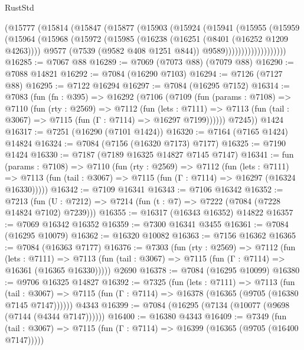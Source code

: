 \begin{lexlean}{RustStd}
\begin{coremodule}
                (@15777
                  (@15814
                    (@15847
                      (@15877
                        (@15903
                          (@15924
                            (@15941
                              (@15955
                                (@15959
                                  (@15964
                                    (@15968
                                      (@15972
                                        (@15985
                                          (@16238 (@16251 (@8401 (@16252 @1209 @4263))))
                                          @9577
                                          (@7539 (@9582 @408 @1251 @844))
                                          @9589)))))))))))))))))))
@16285 := @7067 @88
@16289 := @7069 (@7073 @88) (@7079 @88)
@16290 := @7088 @14821
@16292 := @7084 (@16290 @7103)
@16294 := @7126 (@7127 @88)
@16295 := @7122 @16294
@16297 := @7084 (@16295 @7152)
@16314 := @7083
    (fun (fn : @395) =>
    @16292
      (@7106
        (@7109
          (fun (params : @7108) =>
          @7110
            (fun (rty : @2569) =>
            @7112
              (fun (lets : @7111) =>
              @7113 (fun (tail : @3067) => @7115 (fun (Γ : @7114) => @16297 @7199))))))
        @7245))
    @1424
@16317 := @7251 (@16290 (@7101 @1424))
@16320 := @7164 (@7165 @1424) @14824
@16324 := @7084 (@7156 (@16320 @7173) @7177)
@16325 := @7190 @1424
@16330 := @7187 (@7189 @16325 @14827 @7145 @7147)
@16341 := fun (params : @7108) =>
  @7110
    (fun (rty : @2569) =>
    @7112
      (fun (lets : @7111) =>
      @7113 (fun (tail : @3067) => @7115 (fun (Γ : @7114) => @16297 (@16324 @16330)))))
@16342 := @7109 @16341
@16343 := @7106 @16342
@16352 := @7213
    (fun (U : @7212) => @7214 (fun (t : @7) => @7222 (@7084 (@7228 @14824 @7102) @7239)))
@16355 := @16317 (@16343 @16352) @14822
@16357 := @7069 @16342 @16352
@16359 := @7300 @16341 @3455
@16361 := @7084 (@16295 @10079)
@16362 := @16320 @10082
@16363 := @7156 @16362
@16365 := @7084 (@16363 @7177)
@16376 := @7303
    (fun (rty : @2569) =>
    @7112
      (fun (lets : @7111) =>
      @7113 (fun (tail : @3067) => @7115 (fun (Γ : @7114) => @16361 (@16365 @16330)))))
    @2690
@16378 := @7084 (@16295 @10099)
@16380 := @9706 @16325 @14827
@16392 := @7325
    (fun (lets : @7111) =>
    @7113
      (fun (tail : @3067) =>
      @7115 (fun (Γ : @7114) => @16378 (@16365 (@9705 (@16380 @7145 @7147))))))
    @4343
@16399 := @7084 (@16295 (@7134 (@10077 (@9698 (@7144 (@4344 @7147))))))
@16400 := @16380 @4343
@16409 := @7349
    (fun (tail : @3067) => @7115 (fun (Γ : @7114) => @16399 (@16365 (@9705 (@16400 @7147)))))

\end{coremodule}
\end{lexlean}

